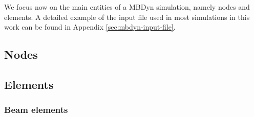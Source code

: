 We focus now on the main entities of a MBDyn simulation, namely nodes and elements. A detailed example of the input file used in most simulations in this work can be found in Appendix \ref{sec:mbdyn-input-file}.


\subsection{Nodes}
\label{sec:mbd-node}

%

\subsection{Elements}
\label{sec:mbd-elem}

\subsubsection{Beam elements}
\label{sec:mbd-beam}

